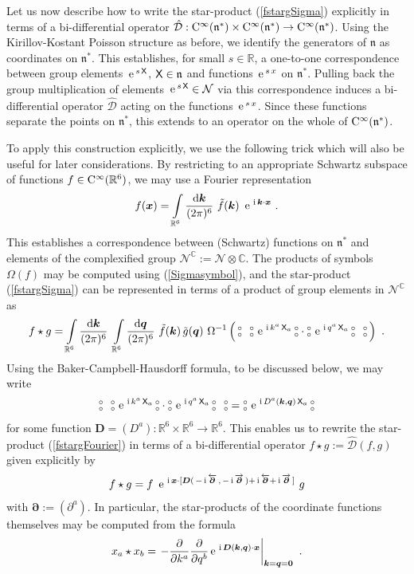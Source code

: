 \documentclass[11pt,a4paper]{article}
\newcommand{\NO}{\mbox{$\substack{\circ\\\circ}$}}      %
\newcommand{\1}{\mathbb{1}}
\newcommand{\mbf}[1]{{\boldsymbol {#1} }}
\def\ii{{\,{\rm i}\,}}
\def\dd{{\rm d}}
\def\CC{{\rm C}}
\def\X{{\sf X}}
\def\mx{{\mbf x}}
\def\mk{{\mbf k}}
\def\mq{{\mbf q}}
\def\mD{{\mbf D}}
\def\mdell{{\mbf\partial}}
\def\mfn{{\mathfrak n}}
\newcommand{\complex}{{\mathbb C}} %
\newcommand{\real}{{\mathbb R}} %
\def\e{{\,\rm e}\,}
\newcommand{\beq}{\begin{eqnarray}}
\newcommand{\eeq}{\end{eqnarray}}
\begin{document}
Let us now describe how to write the star-product (\ref{fstargSigma})
explicitly in terms of a bi-differential operator
$\hat{\mathcal{D}}:\CC^\infty(\mfn^*)\times\CC^\infty(\mfn^*)\to
\CC^\infty(\mfn^*)$. Using the Kirillov-Kostant Poisson structure as
before, we identify the generators of $\mfn$ as coordinates on
$\mfn^*$. This establishes, for small $s\in\real$, a one-to-one
correspondence between group elements $\e^{s\,\X}$, $\X\in\mfn$ and
functions $\e^{s\,x}$ on $\mfn^*$. Pulling back the group
multiplication of elements $\e^{s\,\X}\in\mathcal{N}$ via this
correspondence induces a bi-differential operator $\hat{\mathcal{D}}$
acting on the functions $\e^{s\,x}$. Since these functions separate
the points on $\mfn^*$, this extends to an operator on the whole
of $\CC^\infty(\mfn^*)$.

To apply this construction explicitly, we use the following trick
which will also be useful for later considerations. By restricting to an
appropriate Schwartz subspace of functions $f\in\CC^\infty(\real^6)$,
we may use a Fourier representation
\beq
f(\mx)=\int\limits_{\real^6}\frac{\dd\mk}{(2\pi)^6}~\tilde f(\mk)~
\e^{\ii\mk\cdot\mx} \ .
\label{Fouriertransfdef}\eeq
This establishes a correspondence between (Schwartz) functions on
$\mfn^*$ and elements of the complexified group
$\mathcal{N}^\complex:=\mathcal{N}\otimes\complex$. The products
of symbols $\Omega(f)$ may be computed using (\ref{Sigmasymbol}), and
the star-product (\ref{fstargSigma}) can be represented in terms of a
product of group elements in $\mathcal{N}^\complex$ as
\beq
f\star g=\int\limits_{\real^6}\frac{\dd\mk}{(2\pi)^6}~
\int\limits_{\real^6}\frac{\dd\mq}{(2\pi)^6}~\tilde f(\mk)\,
\tilde g(\mq)~\Omega^{-1}\left(\,\NO~~\NO\,\e^{\ii k^a\,\X_a}\,\NO\cdot
\NO\,\e^{\ii q^a\,\X_a}\,\NO~~\NO\,\right) \ .
\label{fstargFourier}\eeq
Using the Baker-Campbell-Hausdorff formula, to be discussed below, we
may write
\beq
\NO~~\NO\,\e^{\ii k^a\,\X_a}\,\NO\cdot\NO\,\e^{\ii q^a\,\X_a}\,\NO~~\NO=
\NO\,\e^{\ii D^a(\mk,\mq)\,\X_a}\,\NO
\label{NOproductsBCH}\eeq
for some function $\mD=(D^a):\real^6\times\real^6\to\real^6$. This
enables us to rewrite the star-product (\ref{fstargFourier}) in terms
of a bi-differential operator $f\star g:=\hat{\mathcal{D}}(f,g)$ given
explicitly by
\beq
f\star
g=f~\e^{\ii\mx\cdot[\mD(\,-\ii\overleftarrow{\mdell}
\,,\,-\ii\overrightarrow{\mdell}\,)+\ii\overleftarrow{\mdell}+\ii
\overrightarrow{\mdell}\,]}~g
\label{fstargbidiff}\eeq
with $\mdell:=(\partial^a)$. In particular, the star-products of
the coordinate functions themselves may be computed from the formula
\beq
x_a\star x_b=\left.-\frac{\partial}{\partial k^a}\frac\partial
{\partial q^b}\e^{\ii\mD(\mk,\mq)\cdot\mx}\right|_{\mk=\mq=\mbf0} \ .
\label{xastarxb}\eeq
\end{document}
